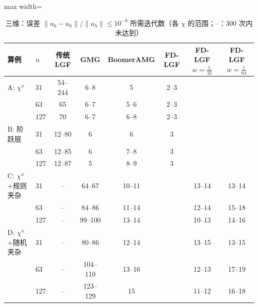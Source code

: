 \begin{table}[H]\centering\small
\caption{三维：误差 $\|u_k-u_h\|/\|u_h\|\le10^{-8}$ 所需迭代数（各 $\chi$ 的范围；--：300 次内未达到）}\label{tab:k83d}
\begin{adjustbox}{max width=\textwidth}
\begin{tabular}{llcccccc}
\toprule
算例 & $n$ & 传统 LGF & GMG & BoomerAMG & FD-LGF & FD-LGF $w{=}\frac1{32}$ & FD-LGF $w{=}\frac1{64}$ \\
\midrule
A: $\chi^x$ & 31 & 54--244 & 6--8 & 5 & 2--3 &  &  \\
 & 63 & 65 & 6--7 & 5--6 & 2--3 &  &  \\
 & 127 & 70 & 6--7 & 6--8 & 2--3 &  &  \\
\midrule
B: 阶跃层 & 31 & 12--80 & 6 & 6 & 3 &  &  \\
 & 63 & 12--85 & 6 & 7--8 & 3 &  &  \\
 & 127 & 12--87 & 5 & 8--9 & 3 &  &  \\
\midrule
C: $\chi^x$+规则夹杂 & 31 & -- & 64--67 & 10--11 &  & 13--14 & 13--14 \\
 & 63 & -- & 84--86 & 11--14 &  & 12--14 & 15--18 \\
 & 127 & -- & 99--100 & 13--14 &  & 10--13 & 14--16 \\
\midrule
D: $\chi^x$+随机夹杂 & 31 & -- & 80--86 & 12--14 &  & 13--15 & 13--15 \\
 & 63 & -- & 104--110 & 13--16 &  & 12--13 & 17--19 \\
 & 127 & -- & 123--129 & 15 &  & 11--12 & 16--18 \\
\bottomrule
\end{tabular}
\end{adjustbox}
\end{table}

